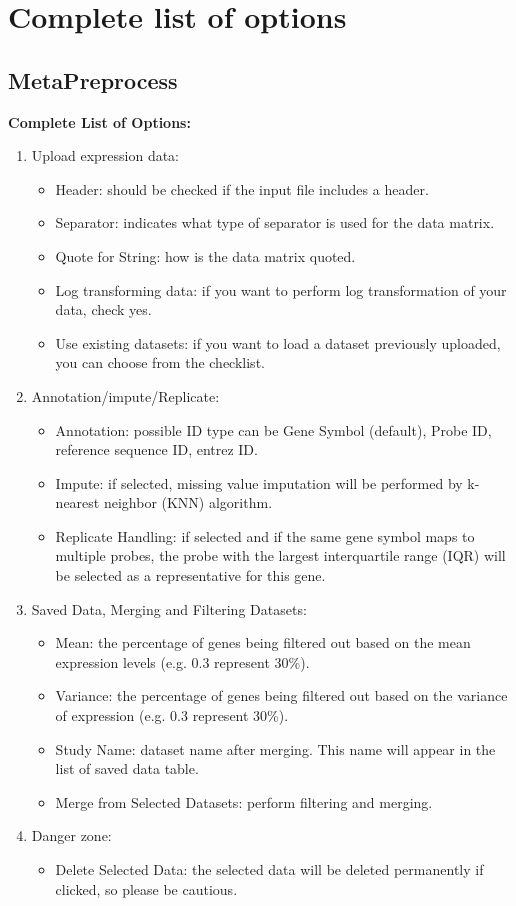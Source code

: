 \section{Complete list of options}
\label{sec:completeList}

\subsection*{MetaPreprocess}
\label{sec:completeList_MetaPreprocess}


\textbf{Complete List of Options:} 
\begin{enumerate}
\item Upload expression data:
\begin{itemize}
\item Header: should be checked if the input file includes a header.
\item Separator: indicates what type of separator is used for the data matrix.
\item Quote for String: how is the data matrix quoted.
\item Log transforming data: if you want to perform log transformation of your data, check yes.
\item Use existing datasets: if you want to load a dataset previously uploaded, you can choose from the checklist.
\end{itemize}
\item Annotation/impute/Replicate:
\begin{itemize}
\item Annotation: possible ID type can be Gene Symbol (default), Probe ID, reference sequence ID, entrez ID.
\item Impute: if selected, missing value imputation will be performed by k-nearest neighbor (KNN) algorithm.
\item Replicate Handling: if selected and if the same gene symbol maps to multiple probes, the probe with the largest interquartile range (IQR) will be selected
as a representative for this gene.
\end{itemize}
\item Saved Data, Merging and Filtering Datasets:
\begin{itemize}
\item Mean: the percentage of genes being filtered out based on the mean expression levels (e.g. 0.3 represent 30\%).
\item Variance: the percentage of genes being filtered out based on the variance of expression (e.g. 0.3 represent 30\%).
\item Study Name: dataset name after merging. This name will appear in the list of saved data table.
\item Merge from Selected Datasets: perform filtering and merging.
\end{itemize}
\item Danger zone:
\begin{itemize}
\item Delete Selected Data: the selected data will be deleted permanently if clicked, so please be cautious.
\end{itemize}

\end{enumerate}


